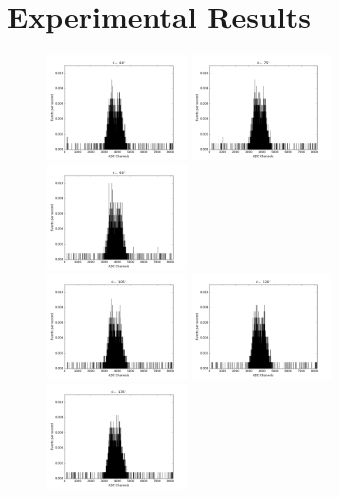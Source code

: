 \documentclass[a4paper,parskip,11pt, DIV12]{scrreprt}
\begin{document}
\section{Experimental Results}\label{app:histogramraw}
%
\begin{figure}[H]
\centering
\includegraphics[width=0.33\textwidth]{60degraw.png}\hfill
\includegraphics[width=0.33\textwidth]{75degraw.png}\hfill
\includegraphics[width=0.33\textwidth]{90degraw.png}\\
\includegraphics[width=0.33\textwidth]{105degraw.png}\hfill
\includegraphics[width=0.33\textwidth]{120degraw.png}\hfill
\includegraphics[width=0.33\textwidth]{135degraw.png}\\

\end{figure}
\end{document}

